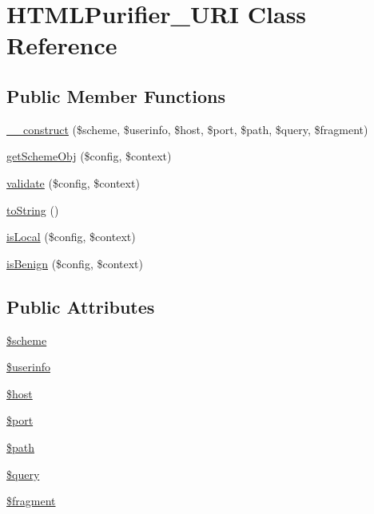 \hypertarget{classHTMLPurifier__URI}{\section{H\+T\+M\+L\+Purifier\+\_\+\+U\+R\+I Class Reference}
\label{classHTMLPurifier__URI}
}
\subsection*{Public Member Functions}
\begin{DoxyCompactItemize}
\item 
\hyperlink{classHTMLPurifier__URI_ac862ec97daf7cb9633ba0944451069ee}{\+\_\+\+\_\+construct} (\$scheme, \$userinfo, \$host, \$port, \$path, \$query, \$fragment)
\item 
\hyperlink{classHTMLPurifier__URI_ac0c155870c465805b87695cdc6d4fc28}{get\+Scheme\+Obj} (\$config, \$context)
\item 
\hyperlink{classHTMLPurifier__URI_a6c6bbc63988cd266c5f264cffce66c55}{validate} (\$config, \$context)
\item 
\hyperlink{classHTMLPurifier__URI_a8eb71e379ee221048f90ba4f24ca98a0}{to\+String} ()
\item 
\hyperlink{classHTMLPurifier__URI_a59d45a827bda836d13f9f21d9f65dbc2}{is\+Local} (\$config, \$context)
\item 
\hyperlink{classHTMLPurifier__URI_ac875b9ce433aaeccb0c1d9b80b75c788}{is\+Benign} (\$config, \$context)
\end{DoxyCompactItemize}
\subsection*{Public Attributes}
\begin{DoxyCompactItemize}
\item 
\hyperlink{classHTMLPurifier__URI_a6e035d8cdd9fa94b370cfe3f8aad5ccf}{\$scheme}
\item 
\hyperlink{classHTMLPurifier__URI_accbbb68c8c8694d1af0449e2a78816c9}{\$userinfo}
\item 
\hyperlink{classHTMLPurifier__URI_a32782c2563b3a3d186e370b3aa956289}{\$host}
\item 
\hyperlink{classHTMLPurifier__URI_a9d2b7107411122efa7e930be6d38aa82}{\$port}
\item 
\hyperlink{classHTMLPurifier__URI_a80bf30e8440f3794b344169ad7add6bd}{\$path}
\item 
\hyperlink{classHTMLPurifier__URI_ab33a9b00eec363db001b271a64fcfba7}{\$query}
\item 
\hyperlink{classHTMLPurifier__URI_a2aefd8357cfc12bb7c50fc47edf980a7}{\$fragment}
\end{DoxyCompactItemize}


